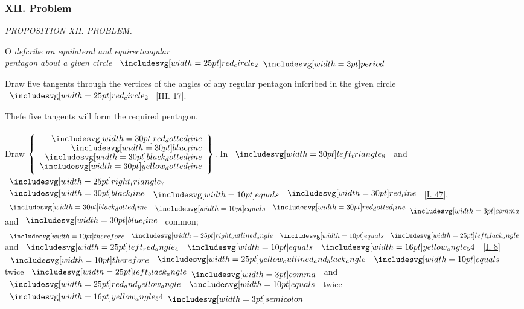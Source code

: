 \documentclass[12pt,preview]{standalone}
\begin{document}
\subsubsection{XII. Problem}

\begin{minipage}[t]{0.64\textwidth}
    \vspace{0pt}

    \begin{center}
        \textit{PROPOSITION XII. PROBLEM.}\label{book4pr12} \\
    \end{center}

    \hfill

    \begin{center}
        \raggedright \lettrine[lines=4, loversize=1, nindent=0pt]{}{}O \textit{deſcribe an equilateral and equirectangular\\ pentagon about a given circle} $\img{red_circle_2} \bperiod$
    \end{center}

    \hfill

    \hfill

    \hfill

    \raggedright Draw five tangents through the vertices of the angles of any regular pentagon inſcribed in the given circle $\img{red_circle_2}$ [\hyperref[book3pr17]{\textsc{III.} 17}].

    \hfill

    \begin{center}
        Theſe five tangents will form the required pentagon.\\
        \hfill\\
        Draw $\left\{\begin{aligned}
                \dottedredline   \\[-2ex]
                \blueline        \\[-2ex]
                \dottedblackline \\[-2ex]
                \dottedyellowline
            \end{aligned}\right\}$. In $\img[0][0][30]{left_triangle_8}$ and $\img{right_triangle_7}$\\
        $\blackline \bequals \redline$ [\hyperref[book1pr47]{\textsc{I.} 47}],\\
        $\dottedblackline \bequals \dottedredline \bcomma$ and $\blueline$ common;\\
        $\btherefore \img{right_outlined_angle} \bequals \img{left_black_angle}$ and $\img{left_red_angle_4} \bequals \img[0][0][16]{yellow_angle_54}$ [\hyperref[book1pr8]{\textsc{I.} 8}]\\
        $\btherefore \img{yellow_outlined_and_black_angle} \bequals$ twice $\img{left_black_angle} \bcomma$ and $\img{red_and_yellow_angle} \bequals$ twice $\img[0][0][16]{yellow_angle_54} \bsemicolon$
    \end{center}


\end{minipage}
\end{document}
